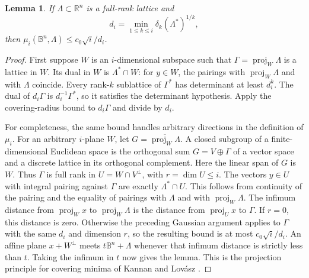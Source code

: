 \documentclass[11pt]{article}
\newtheorem{lemma}[theorem]{Lemma}
\newcommand{\B}{\mathbb B}
\newcommand{\R}{\mathbb R}
\newcommand{\proj}{\operatorname{proj}}
\begin{document}
\begin{lemma}\label{lem:transfer}
If \(\Lambda\subset\R^n\) is a full-rank lattice and
\[
 d_i=\min_{1\le k\le i}\delta_k(\Lambda^*)^{1/k},
\]
then \(\mu_i(\B^n,\Lambda)\le c_0\sqrt i/d_i\).
\end{lemma}

\begin{proof}
First suppose \(W\) is an \(i\)-dimensional subspace such that
\(\Gamma=\proj_W\Lambda\) is a lattice in \(W\).
Its dual in \(W\) is \(\Lambda^*\cap W\): for \(y\in W\), the pairings
with \(\proj_W\Lambda\) and with \(\Lambda\) coincide.
Every rank-\(k\) sublattice of \(\Gamma^*\) has determinant at least
\(d_i^k\). The dual of \(d_i\Gamma\) is \(d_i^{-1}\Gamma^*\), so it
satisfies the determinant hypothesis. Apply the covering-radius
bound to \(d_i\Gamma\) and divide by \(d_i\).

For completeness, the same bound handles arbitrary directions in
the definition of \(\mu_i\).
For an arbitrary \(i\)-plane \(W\), let \(G=\overline{\proj_W\Lambda}\).
A closed subgroup of a finite-dimensional Euclidean space is the
orthogonal sum \(G=V\oplus\Gamma\) of a vector space and a discrete
lattice in its orthogonal complement.
Here the linear span of \(G\) is \(W\). Thus \(\Gamma\) is
full rank in \(U=W\cap V^\perp\), with \(r=\dim U\le i\).
The vectors \(y\in U\) with integral pairing against \(\Gamma\) are
exactly \(\Lambda^*\cap U\). This follows from continuity of the
pairing and the equality of pairings with \(\Lambda\) and with
\(\proj_W\Lambda\).
The infimum distance from \(\proj_W x\) to \(\proj_W\Lambda\)
is the distance from \(\proj_U x\) to \(\Gamma\).
If \(r=0\), this distance is zero. Otherwise the preceding Gaussian
argument applies to \(\Gamma\) with the same \(d_i\) and dimension
\(r\), so the resulting bound is at most \(c_0\sqrt i/d_i\).
An affine plane \(x+W^\perp\) meets \(t\B^n+\Lambda\) whenever
that infimum distance is strictly less than \(t\).
Taking the infimum in \(t\) now gives the lemma. This is the
projection principle for covering minima of Kannan and Lov\'asz
\cite{KL}.
\end{proof}
\end{document}

